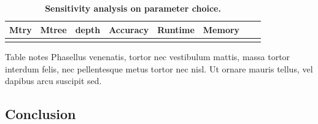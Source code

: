 \documentclass[10pt,a4paper]{article}  %
\begin{document}
\begin{table}[!ht]
\caption{
{\bf Sensitivity analysis on parameter choice.}}
\begin{tabular}{|l|l|l|l|l|l|l|l|}
\hline
\bf{Mtry}  & \bf{Mtree} & \bf{depth} & \bf{Accuracy} & \bf{Runtime} & \bf{Memory} \\
\hline
&&&&&\\ \hline
\end{tabular}
\begin{flushleft} 
  Table notes Phasellus venenatis, tortor nec vestibulum mattis, massa tortor interdum felis, nec pellentesque metus
  tortor nec nisl. Ut ornare mauris tellus, vel dapibus arcu suscipit sed.
\end{flushleft}
\label{table2}
\end{table}








\subsection*{Conclusion}
\end{document}
